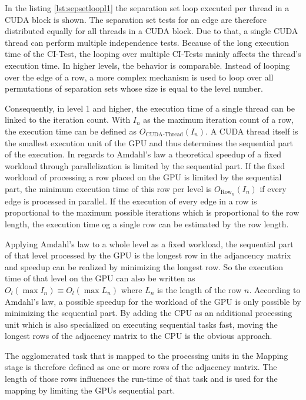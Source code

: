 In the listing \ref{lst:sepsetloopl1} the separation set loop executed per thread in a CUDA block is shown. The separation set tests for an edge are therefore distributed equally for all threads in a CUDA block. Due to that, a single CUDA thread can perform multiple independence tests. Because of the long execution time of the CI-Test, the looping over multiple CI-Tests mainly affects the thread's execution time. In higher levels, the behavior is comparable. Instead of looping over the edge of a row, a more complex mechanism is used to loop over all permutations of separation sets whose size is equal to the level number.

Consequently, in level 1 and higher, the execution time of a single thread can be linked to the iteration count. With $I_n$ as the maximum iteration count of a row, the execution time can be defined as $O_{\text{CUDA-Thread}}(I_n)$. A CUDA thread itself is the smallest execution unit of the GPU and thus determines the sequential part of the execution. In regards to Amdahl's law \cite{amdahlValiditySingleProcessor1967} a theoretical speedup of a fixed workload through parallelization is limited by the sequential part. If the fixed workload of processing a row placed on the GPU is limited by the sequential part, the minimum execution time of this row per level is $O_{\text{Row}_n}(I_n)$ if every edge is processed in parallel. If the execution of every edge in a row is proportional to the maximum possible iterations which is proportional to the row length, the execution time og a single row can be estimated by the row length.

Applying Amdahl's law to a whole level as a fixed workload, the sequential part of that level processed by the GPU is the longest row in the adjancency matrix and speedup can be realized by minimizing the longest row. So the execution time of that level on the GPU can also be written as $O_{l}(\max I_n) \equiv O_{l}(\max L_n)$ where $L_n$ is the length of the row $n$. According to Amdahl's law, a possible speedup for the workload of the GPU is only possible by minimizing the sequential part. By adding the CPU as an additional processing unit which is also specialized on executing sequential tasks fast, moving the longest rows of the adjacency matrix to the CPU is the obvious approach.

The agglomerated task that is mapped to the processing units in the Mapping stage is therefore defined as one or more rows of the adjacency matrix. The length of those rows influences the run-time of that task and is used for the mapping by limiting the GPUs sequential part.

